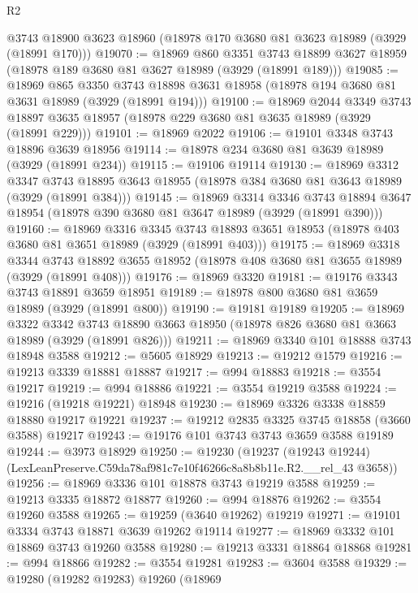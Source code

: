 \begin{lexlean}{R2}
\begin{coremodule}
    @3743
    @18900
    @3623
    @18960
    (@18978 @170 @3680 @81 @3623 @18989 (@3929 (@18991 @170)))
@19070 := @18969
    @860
    @3351
    @3743
    @18899
    @3627
    @18959
    (@18978 @189 @3680 @81 @3627 @18989 (@3929 (@18991 @189)))
@19085 := @18969
    @865
    @3350
    @3743
    @18898
    @3631
    @18958
    (@18978 @194 @3680 @81 @3631 @18989 (@3929 (@18991 @194)))
@19100 := @18969
    @2044
    @3349
    @3743
    @18897
    @3635
    @18957
    (@18978 @229 @3680 @81 @3635 @18989 (@3929 (@18991 @229)))
@19101 := @18969 @2022
@19106 := @19101 @3348 @3743 @18896 @3639 @18956
@19114 := @18978 @234 @3680 @81 @3639 @18989 (@3929 (@18991 @234))
@19115 := @19106 @19114
@19130 := @18969
    @3312
    @3347
    @3743
    @18895
    @3643
    @18955
    (@18978 @384 @3680 @81 @3643 @18989 (@3929 (@18991 @384)))
@19145 := @18969
    @3314
    @3346
    @3743
    @18894
    @3647
    @18954
    (@18978 @390 @3680 @81 @3647 @18989 (@3929 (@18991 @390)))
@19160 := @18969
    @3316
    @3345
    @3743
    @18893
    @3651
    @18953
    (@18978 @403 @3680 @81 @3651 @18989 (@3929 (@18991 @403)))
@19175 := @18969
    @3318
    @3344
    @3743
    @18892
    @3655
    @18952
    (@18978 @408 @3680 @81 @3655 @18989 (@3929 (@18991 @408)))
@19176 := @18969 @3320
@19181 := @19176 @3343 @3743 @18891 @3659 @18951
@19189 := @18978 @800 @3680 @81 @3659 @18989 (@3929 (@18991 @800))
@19190 := @19181 @19189
@19205 := @18969
    @3322
    @3342
    @3743
    @18890
    @3663
    @18950
    (@18978 @826 @3680 @81 @3663 @18989 (@3929 (@18991 @826)))
@19211 := @18969 @3340 @101 @18888 @3743 @18948 @3588
@19212 := @5605 @18929
@19213 := @19212 @1579
@19216 := @19213 @3339 @18881 @18887
@19217 := @994 @18883
@19218 := @3554 @19217
@19219 := @994 @18886
@19221 := @3554 @19219 @3588
@19224 := @19216 (@19218 @19221) @18948
@19230 := @18969 @3326 @3338 @18859 @18880 @19217 @19221
@19237 := @19212 @2835 @3325 @3745 @18858 (@3660 @3588) @19217
@19243 := @19176 @101 @3743 @3743 @3659 @3588 @19189
@19244 := @3973 @18929
@19250 := @19230
    (@19237 (@19243 @19244) (LexLeanPreserve.C59da78af981c7e10f46266c8a8b8b11e.R2.__rel_43 @3658))
@19256 := @18969 @3336 @101 @18878 @3743 @19219 @3588
@19259 := @19213 @3335 @18872 @18877
@19260 := @994 @18876
@19262 := @3554 @19260 @3588
@19265 := @19259 (@3640 @19262) @19219
@19271 := @19101 @3334 @3743 @18871 @3639 @19262 @19114
@19277 := @18969 @3332 @101 @18869 @3743 @19260 @3588
@19280 := @19213 @3331 @18864 @18868
@19281 := @994 @18866
@19282 := @3554 @19281
@19283 := @3604 @3588
@19329 := @19280
    (@19282 @19283)
    @19260
    (@18969

\end{coremodule}
\end{lexlean}
